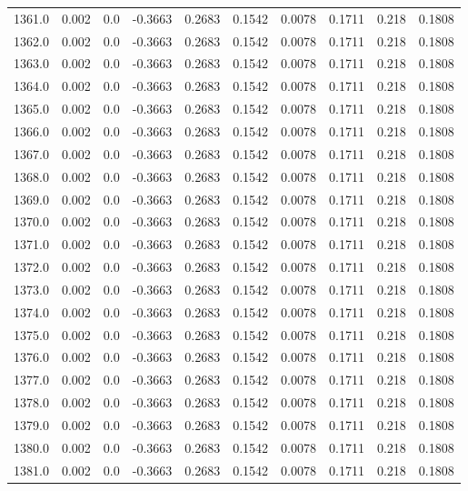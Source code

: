 \begin{longtable}{lrrrrrrrrr}
1361.0 & 0.002 & 0.0 & -0.3663 & 0.2683 & 0.1542 & 0.0078 & 0.1711 & 0.218 & 0.1808 \\
1362.0 & 0.002 & 0.0 & -0.3663 & 0.2683 & 0.1542 & 0.0078 & 0.1711 & 0.218 & 0.1808 \\
1363.0 & 0.002 & 0.0 & -0.3663 & 0.2683 & 0.1542 & 0.0078 & 0.1711 & 0.218 & 0.1808 \\
1364.0 & 0.002 & 0.0 & -0.3663 & 0.2683 & 0.1542 & 0.0078 & 0.1711 & 0.218 & 0.1808 \\
1365.0 & 0.002 & 0.0 & -0.3663 & 0.2683 & 0.1542 & 0.0078 & 0.1711 & 0.218 & 0.1808 \\
1366.0 & 0.002 & 0.0 & -0.3663 & 0.2683 & 0.1542 & 0.0078 & 0.1711 & 0.218 & 0.1808 \\
1367.0 & 0.002 & 0.0 & -0.3663 & 0.2683 & 0.1542 & 0.0078 & 0.1711 & 0.218 & 0.1808 \\
1368.0 & 0.002 & 0.0 & -0.3663 & 0.2683 & 0.1542 & 0.0078 & 0.1711 & 0.218 & 0.1808 \\
1369.0 & 0.002 & 0.0 & -0.3663 & 0.2683 & 0.1542 & 0.0078 & 0.1711 & 0.218 & 0.1808 \\
1370.0 & 0.002 & 0.0 & -0.3663 & 0.2683 & 0.1542 & 0.0078 & 0.1711 & 0.218 & 0.1808 \\
1371.0 & 0.002 & 0.0 & -0.3663 & 0.2683 & 0.1542 & 0.0078 & 0.1711 & 0.218 & 0.1808 \\
1372.0 & 0.002 & 0.0 & -0.3663 & 0.2683 & 0.1542 & 0.0078 & 0.1711 & 0.218 & 0.1808 \\
1373.0 & 0.002 & 0.0 & -0.3663 & 0.2683 & 0.1542 & 0.0078 & 0.1711 & 0.218 & 0.1808 \\
1374.0 & 0.002 & 0.0 & -0.3663 & 0.2683 & 0.1542 & 0.0078 & 0.1711 & 0.218 & 0.1808 \\
1375.0 & 0.002 & 0.0 & -0.3663 & 0.2683 & 0.1542 & 0.0078 & 0.1711 & 0.218 & 0.1808 \\
1376.0 & 0.002 & 0.0 & -0.3663 & 0.2683 & 0.1542 & 0.0078 & 0.1711 & 0.218 & 0.1808 \\
1377.0 & 0.002 & 0.0 & -0.3663 & 0.2683 & 0.1542 & 0.0078 & 0.1711 & 0.218 & 0.1808 \\
1378.0 & 0.002 & 0.0 & -0.3663 & 0.2683 & 0.1542 & 0.0078 & 0.1711 & 0.218 & 0.1808 \\
1379.0 & 0.002 & 0.0 & -0.3663 & 0.2683 & 0.1542 & 0.0078 & 0.1711 & 0.218 & 0.1808 \\
1380.0 & 0.002 & 0.0 & -0.3663 & 0.2683 & 0.1542 & 0.0078 & 0.1711 & 0.218 & 0.1808 \\
1381.0 & 0.002 & 0.0 & -0.3663 & 0.2683 & 0.1542 & 0.0078 & 0.1711 & 0.218 & 0.1808 \\

\end{longtable}
